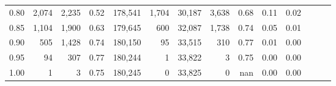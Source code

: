 \begin{tabular}{rrrrrrrrrrrrrr}
0.80 &   2,074 &  2,235 &  0.52 &  178,541 &    1,704 &  30,187 &   3,638 &  0.68 &  0.11 &      0.02 \\
0.85 &   1,104 &  1,900 &  0.63 &  179,645 &      600 &  32,087 &   1,738 &  0.74 &  0.05 &      0.01 \\
0.90 &     505 &  1,428 &  0.74 &  180,150 &       95 &  33,515 &     310 &  0.77 &  0.01 &      0.00 \\
0.95 &      94 &    307 &  0.77 &  180,244 &        1 &  33,822 &       3 &  0.75 &  0.00 &      0.00 \\
1.00 &       1 &      3 &  0.75 &  180,245 &        0 &  33,825 &       0 &   nan &  0.00 &      0.00 \\
\bottomrule
\end{tabular}
